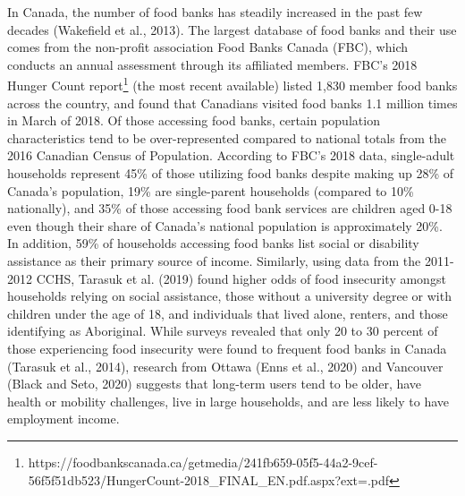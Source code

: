 \documentclass[]{elsarticle} %
\begin{document}
In Canada, the number of food banks has steadily increased in the past
few decades (Wakefield et al., 2013). The largest database of food banks
and their use comes from the non-profit association Food Banks Canada
(FBC), which conducts an annual assessment through its affiliated
members. FBC's 2018 Hunger Count report\footnote{https://foodbankscanada.ca/getmedia/241fb659-05f5-44a2-9cef-56f5f51db523/HungerCount-2018\_FINAL\_EN.pdf.aspx?ext=.pdf}
(the most recent available) listed 1,830 member food banks across the
country, and found that Canadians visited food banks 1.1 million times
in March of 2018. Of those accessing food banks, certain population
characteristics tend to be over-represented compared to national totals
from the 2016 Canadian Census of Population. According to FBC's 2018
data, single-adult households represent 45\% of those utilizing food
banks despite making up 28\% of Canada's population, 19\% are
single-parent households (compared to 10\% nationally), and 35\% of
those accessing food bank services are children aged 0-18 even though
their share of Canada's national population is approximately 20\%. In
addition, 59\% of households accessing food banks list social or
disability assistance as their primary source of income. Similarly,
using data from the 2011-2012 CCHS, Tarasuk et al. (2019) found higher
odds of food insecurity amongst households relying on social assistance,
those without a university degree or with children under the age of 18,
and individuals that lived alone, renters, and those identifying as
Aboriginal. While surveys revealed that only 20 to 30 percent of those
experiencing food insecurity were found to frequent food banks in Canada
(Tarasuk et al., 2014), research from Ottawa (Enns et al., 2020) and
Vancouver (Black and Seto, 2020) suggests that long-term users tend to
be older, have health or mobility challenges, live in large households,
and are less likely to have employment income.
\end{document}
